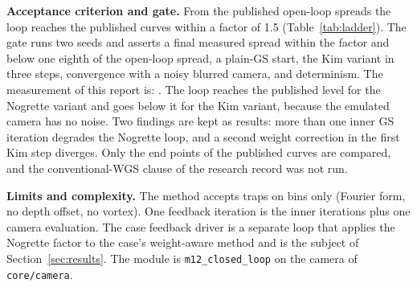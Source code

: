 \textbf{Acceptance criterion and gate.} From the published open-loop spreads the loop reaches the published curves within a factor of 1.5 (Table~\ref{tab:ladder}). The gate runs two seeds and asserts a final measured spread within the factor and below one eighth of the open-loop spread, a plain-GS start, the Kim variant in three steps, convergence with a noisy blurred camera, and determinism. The measurement of this report is: . The loop reaches the published level for the Nogrette variant and goes below it for the Kim variant, because the emulated camera has no noise. Two findings are kept as results: more than one inner GS iteration degrades the Nogrette loop, and a second weight correction in the first Kim step diverges. Only the end points of the published curves are compared, and the conventional-WGS clause of the research record was not run.

\textbf{Limits and complexity.} The method accepts traps on bins only (Fourier form, no depth offset, no vortex). One feedback iteration is the inner iterations plus one camera evaluation. The case feedback driver is a separate loop that applies the Nogrette factor to the case's weight-aware method and is the subject of Section~\ref{sec:results}. The module is \texttt{m12\_closed\_loop} on the camera of \texttt{core/camera}.
